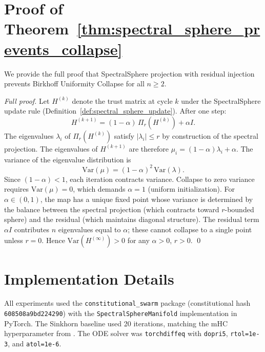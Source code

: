 \documentclass{iclr2025_conference}
\newcommand{\constitutionalhash}{\texttt{608508a9bd224290}}
\begin{document}
\section{Proof of Theorem~\ref{thm:spectral_sphere_prevents_collapse}}
\label{app:proof_main}

We provide the full proof that SpectralSphere projection with residual injection prevents
Birkhoff Uniformity Collapse for all $n \geq 2$.

\begin{proof}[Full proof]
  Let $H^{(k)}$ denote the trust matrix at cycle $k$ under the SpectralSphere update rule
  (Definition~\ref{def:spectral_sphere_update}). After one step:
  \[
    H^{(k+1)} = (1-\alpha)\,\Pi_r\!\left(H^{(k)}\right) + \alpha I.
  \]
  The eigenvalues $\lambda_i$ of $\Pi_r(H^{(k)})$ satisfy $|\lambda_i| \leq r$ by
  construction of the spectral projection. The eigenvalues of $H^{(k+1)}$ are therefore
  $\mu_i = (1-\alpha)\lambda_i + \alpha$. The variance of the eigenvalue distribution is
  \[
    \mathrm{Var}(\mu) = (1-\alpha)^2\,\mathrm{Var}(\lambda).
  \]
  Since $(1-\alpha) < 1$, each iteration contracts variance. Collapse to zero variance
  requires $\mathrm{Var}(\mu) = 0$, which demands $\alpha = 1$ (uniform initialization).
  For $\alpha \in (0,1)$, the map has a unique fixed point whose variance is determined by
  the balance between the spectral projection (which contracts toward $r$-bounded sphere)
  and the residual (which maintains diagonal structure). The residual term $\alpha I$
  contributes $n$ eigenvalues equal to $\alpha$; these cannot collapse to a single point
  unless $r = 0$. Hence $\mathrm{Var}(H^{(\infty)}) > 0$ for any $\alpha > 0$, $r > 0$. \qed
\end{proof}

\section{Implementation Details}
\label{app:implementation}

All experiments used the \texttt{constitutional\_swarm} package
(constitutional hash \constitutionalhash) with the \texttt{SpectralSphereManifold}
implementation in PyTorch. The Sinkhorn baseline used 20 iterations, matching the
mHC hyperparameter from \cite{xie2025mhc}. The ODE solver was \texttt{torchdiffeq}
with \texttt{dopri5}, \texttt{rtol=1e-3}, and \texttt{atol=1e-6}.
\end{document}
